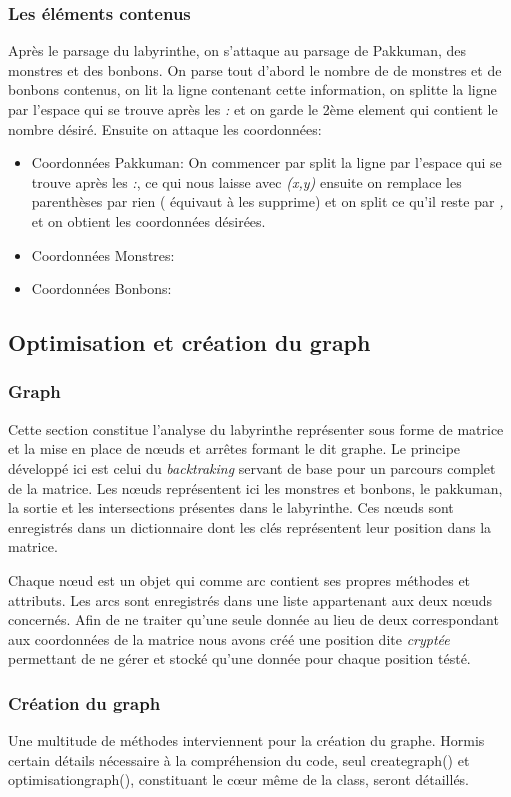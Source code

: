 \documentclass[12pt, oneside]{article}
\begin{document}
\subsubsection{Les éléments contenus}
Après le parsage du labyrinthe, on s'attaque au parsage de Pakkuman, des monstres et des bonbons.
On parse tout d'abord le nombre de de monstres et de bonbons contenus, on lit la ligne contenant cette information, on splitte la ligne par l'espace qui se trouve après les \emph{:} et on garde le 2ème element qui contient le nombre désiré.
Ensuite on attaque les coordonnées:

\begin{itemize}
\item 
Coordonnées Pakkuman: On commencer par split la ligne par l'espace qui se trouve après les \emph{:}, ce qui nous laisse avec \emph{(x,y)} ensuite on remplace les parenthèses par rien ( équivaut à les supprime) et on split ce qu'il reste par \emph{,} et on obtient les coordonnées désirées.
\item
Coordonnées Monstres:
\item
Coordonnées Bonbons:
\end{itemize}

\subsection{Optimisation et création du graph}
\subsubsection{Graph}
Cette section constitue l’analyse du labyrinthe représenter sous forme de matrice et la mise en place de nœuds et arrêtes formant le dit graphe.
Le principe développé ici est celui du \emph{backtraking}  servant de base pour un parcours complet de la matrice. Les nœuds représentent ici les monstres et bonbons, le pakkuman, la sortie et les intersections présentes dans le labyrinthe. Ces nœuds sont enregistrés dans un dictionnaire dont les clés représentent leur position dans la matrice.

Chaque nœud est un objet qui comme arc contient ses propres méthodes et attributs. Les arcs sont enregistrés dans une liste appartenant aux deux nœuds concernés. 
Afin de ne traiter qu’une seule donnée au lieu de deux correspondant aux coordonnées de la matrice nous avons créé une position dite \emph{cryptée} permettant de ne gérer et stocké qu’une donnée pour chaque position tésté.
\subsubsection{Création du graph}
Une multitude de méthodes interviennent pour la création du graphe. Hormis certain détails nécessaire à la compréhension  du code, seul create\textunderscore graph() et optimisation\textunderscore graph(), constituant le cœur même de la class, seront détaillés.
\end{document}
